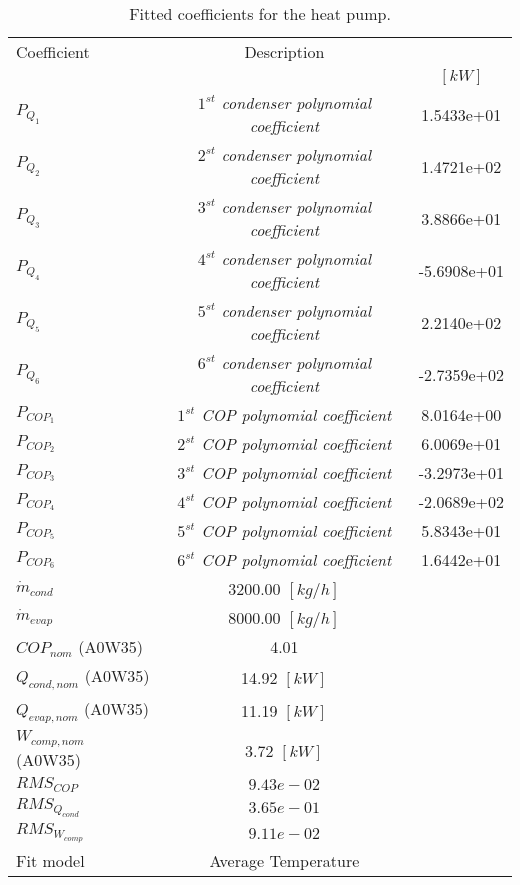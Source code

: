 \documentclass[english]{SPFShortReport}
\author{Dani Carbonell}
\begin{document}
\begin{table}[!ht]
\begin{small}
\caption{Fitted coefficients for the heat pump.}
\begin{center}
\resizebox{12cm}{!} 
{
\begin{tabular}{l | c c } 
\hline
\hline
Coefficient &Description & \\ 
 & &$[kW]$\\ 
\hline
$P_{Q_{1}}$ & \emph{$1^{st}$ condenser polynomial coefficient}  & 1.5433e+01    \\ 
$P_{Q_{2}}$ & \emph{$2^{st}$ condenser polynomial coefficient}  & 1.4721e+02    \\ 
$P_{Q_{3}}$ & \emph{$3^{st}$ condenser polynomial coefficient}  & 3.8866e+01    \\ 
$P_{Q_{4}}$ & \emph{$4^{st}$ condenser polynomial coefficient}  & -5.6908e+01    \\ 
$P_{Q_{5}}$ & \emph{$5^{st}$ condenser polynomial coefficient}  & 2.2140e+02    \\ 
$P_{Q_{6}}$ & \emph{$6^{st}$ condenser polynomial coefficient}  & -2.7359e+02    \\ 
\hline
$P_{COP_{1}}$ & \emph{$1^{st}$ COP polynomial coefficient}  & 8.0164e+00    \\ 
$P_{COP_{2}}$ & \emph{$2^{st}$ COP polynomial coefficient}  & 6.0069e+01    \\ 
$P_{COP_{3}}$ & \emph{$3^{st}$ COP polynomial coefficient}  & -3.2973e+01    \\ 
$P_{COP_{4}}$ & \emph{$4^{st}$ COP polynomial coefficient}  & -2.0689e+02    \\ 
$P_{COP_{5}}$ & \emph{$5^{st}$ COP polynomial coefficient}  & 5.8343e+01    \\ 
$P_{COP_{6}}$ & \emph{$6^{st}$ COP polynomial coefficient}  & 1.6442e+01    \\ 
\hline
$\dot m_{cond}$ & 3200.00 $[kg/h]$ \\ 
$\dot m_{evap}$ & 8000.00 $[kg/h]$ \\ 
\hline
$COP_{nom}$ (A0W35)& 4.01 \\ 
$Q_{cond,nom}$ (A0W35)& 14.92 $[kW]$\\ 
$Q_{evap,nom}$ (A0W35)& 11.19 $[kW]$\\ 
$W_{comp,nom}$ (A0W35)& 3.72 $[kW]$\\ 
\hline
 $RMS_{COP}$ & $9.43e-02$ \\ 
 $RMS_{Q_{cond}}$ & $3.65e-01$ \\ 
 $RMS_{W_{comp}}$ & $9.11e-02$ \\ 
\hline
Fit model & Average Temperature\\ 
\hline
\hline
\end{tabular}
}
\label{CoefTable}
\end{center}
\end{small}
\end{table}
\end{document}
